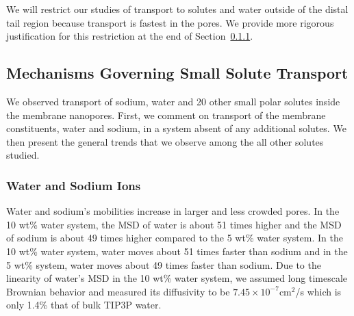 \documentclass[journal=jpcbfk,manuscript=article]{achemso}
\begin{document}
  We will restrict our studies of transport to solutes and water outside of the 
  distal tail region because transport is fastest in the pores. We provide more 
  rigorous justification for this restriction at the end of Section~\ref{section:transport_water_sodium}.

  \subsection{Mechanisms Governing Small Solute Transport}\label{section:mechanism_overview} 

  We observed transport of sodium, water and 20 other small polar solutes
  inside the membrane nanopores. First, we comment on transport of the
  membrane constituents, water and sodium, in a system absent of any additional
  solutes. We then present the general trends that we observe among the
  all other solutes studied.
  
  \subsubsection{Water and Sodium Ions}\label{section:transport_water_sodium} 

  Water and sodium's mobilities increase in larger and less crowded pores. 
  In the 10 wt\% water system, the MSD of water is about 51 times higher and
  the MSD of sodium is about 49 times higher compared to the 5 wt\% water system. 
  In the 10 wt\% water system, water moves about 51 times faster than sodium 
  and in the 5 wt\% system, water moves about 49 times faster than sodium. Due to
  the linearity of water's MSD in the 10 wt\% water system, we assumed
  long timescale Brownian behavior and measured its diffusivity to be 
  $7.45 \times 10^{-7}$cm$^2$/s which is only 1.4\% that of bulk TIP3P 
  water.~\cite{mahoney_diffusion_2000} %
  
\end{document}
